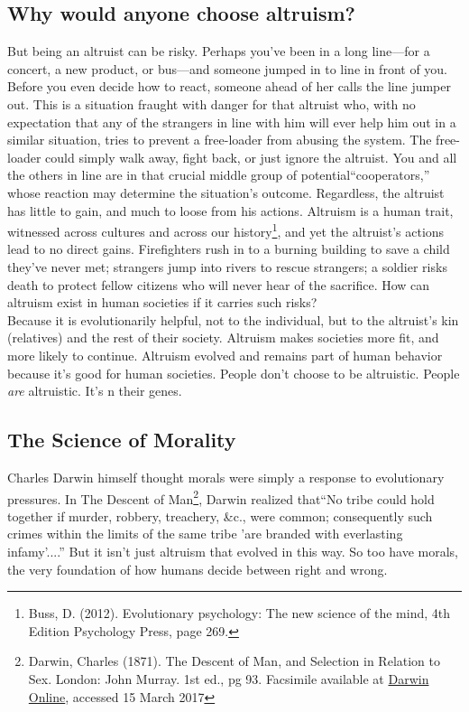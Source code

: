 \subsection{Why would anyone choose altruism?}
But  being an altruist can be risky. Perhaps you've been in a long line---for a concert, a new product, or bus---and someone jumped in to line in front of you. Before you even decide how to react, someone ahead of her calls the line jumper out. This is a situation fraught with danger for that altruist who, with no expectation that any of the strangers in line with him will ever help him out in a similar situation, tries to prevent a free-loader from abusing the system. The free-loader could simply walk away, fight back, or just ignore the altruist. You and all the others in line are in that crucial middle group of potential``cooperators,'' whose reaction may determine the situation's outcome. Regardless, the altruist has little to gain, and much to loose from his actions. Altruism is a human trait, witnessed across cultures and across our history\footnote{Buss, D. (2012). Evolutionary psychology: The new science of the mind, 4th Edition Psychology Press, page 269.}, and yet the altruist's actions lead to no direct gains. Firefighters rush in to a burning building to save a child they've never met; strangers jump into rivers to rescue strangers; a soldier risks death to protect fellow citizens who will never hear of the sacrifice. How can altruism exist in human societies if it carries such risks? \\

Because it is evolutionarily helpful, not to the individual, but to the altruist's kin (relatives) and the rest of their society. Altruism makes societies more fit, and more likely to continue. Altruism evolved and remains part of human behavior because it's good for human societies. People don't choose to be altruistic. People \emph{are} altruistic. It's n their genes.\\

\subsection{The Science of Morality}\label{moral_science}
Charles Darwin himself thought morals were simply a response to evolutionary pressures. In The Descent of Man\footnote{Darwin, Charles (1871). The Descent of Man, and Selection in Relation to Sex. London: John Murray. 1st ed., pg 93. Facsimile available at \href{http://darwin-online.org.uk/EditorialIntroductions/Freeman_TheDescentofMan.html}{Darwin Online}, accessed 15 March 2017}, Darwin realized that``No tribe could hold together if murder, robbery, treachery, \&c., were common; consequently such crimes within the limits of the same tribe 'are branded with everlasting infamy'....'' But it isn't just altruism that evolved in this way. So too have morals, the very foundation of how humans decide between right and wrong. 
  
